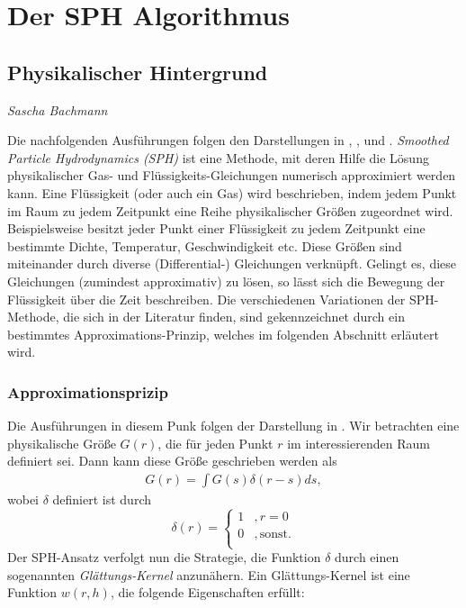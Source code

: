 \chapter{Der SPH Algorithmus}
\thispagestyle{empty}

\section{Physikalischer Hintergrund}

\begin{center}
\emph{{\small Sascha Bachmann}}
\end{center}

\bigskip

\noindent Die nachfolgenden Ausführungen folgen den Darstellungen in \cite{IntroSPH}, \cite{FlowSPH}, \cite{FluidSim} und \cite{BoundarySPH}. \emph{Smoothed Particle Hydrodynamics (SPH)} ist eine Methode, mit deren Hilfe die Lösung physikalischer Gas- und Flüssigkeits-Gleichungen numerisch approximiert werden kann. Eine Flüssigkeit (oder auch ein Gas) wird beschrieben, indem jedem Punkt im Raum zu jedem Zeitpunkt eine Reihe physikalischer Größen zugeordnet wird. Beispielsweise besitzt jeder Punkt einer Flüssigkeit zu jedem Zeitpunkt eine bestimmte Dichte, Temperatur, Geschwindigkeit etc. Diese Größen sind miteinander durch diverse (Differential-) Gleichungen verknüpft. Gelingt es, diese Gleichungen (zumindest approximativ) zu lösen, so lässt sich die Bewegung der Flüssigkeit über die Zeit beschreiben. Die verschiedenen Variationen der SPH-Methode, die sich in der Literatur finden, sind gekennzeichnet durch ein bestimmtes Approximations-Prinzip, welches im folgenden Abschnitt erläutert wird.

\subsection*{Approximationsprizip} Die Ausführungen in diesem Punk folgen der Darstellung in \cite[S. 89 f]{IntroSPH}. Wir betrachten eine physikalische Größe $G(r)$, die für jeden Punkt $r$ im interessierenden Raum definiert sei. Dann kann diese Größe geschrieben werden als
\begin{align}\label{eqn1}
G(r) = \int G(s)\delta(r - s) ds,
\end{align}
wobei $\delta$ definiert ist durch
\[
\delta(r) = \begin{cases}
1 & , r = 0 \\
0 & , \text{sonst}.\\
\end{cases}
\]
Der SPH-Ansatz verfolgt nun die Strategie, die Funktion $\delta$ durch einen sogenannten \emph{Glättungs-Kernel} anzunähern. Ein Glättungs-Kernel ist eine Funktion $w(r, h)$, die folgende Eigenschaften erfüllt:


